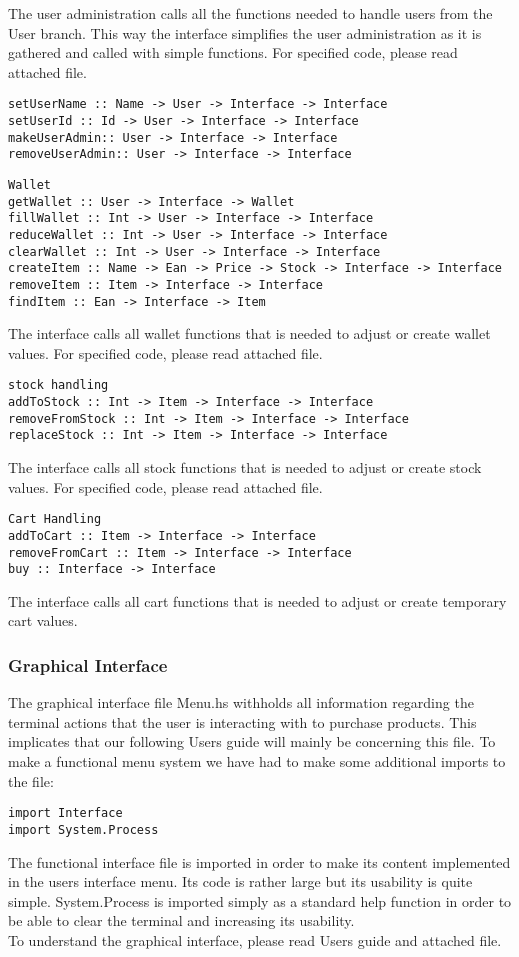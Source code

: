\documentclass[11pt]{article}
\begin{document}
The user administration calls all the functions needed to handle users from the User branch. This way the interface simplifies the user administration as it is gathered and called with simple functions. For specified code, please read attached file.
\begin{lstlisting}
setUserName :: Name -> User -> Interface -> Interface
setUserId :: Id -> User -> Interface -> Interface
makeUserAdmin:: User -> Interface -> Interface
removeUserAdmin:: User -> Interface -> Interface
\end{lstlisting}
\begin{lstlisting}
Wallet
getWallet :: User -> Interface -> Wallet
fillWallet :: Int -> User -> Interface -> Interface
reduceWallet :: Int -> User -> Interface -> Interface
clearWallet :: Int -> User -> Interface -> Interface
createItem :: Name -> Ean -> Price -> Stock -> Interface -> Interface
removeItem :: Item -> Interface -> Interface
findItem :: Ean -> Interface -> Item
\end{lstlisting}
The interface calls all wallet functions that is needed to adjust or create wallet values. For specified code, please read attached file.
\begin{lstlisting}
stock handling
addToStock :: Int -> Item -> Interface -> Interface
removeFromStock :: Int -> Item -> Interface -> Interface
replaceStock :: Int -> Item -> Interface -> Interface
\end{lstlisting}
The interface calls all stock functions that is needed to adjust or create stock values. For specified code, please read attached file.
\begin{lstlisting}
Cart Handling
addToCart :: Item -> Interface -> Interface
removeFromCart :: Item -> Interface -> Interface
buy :: Interface -> Interface
\end{lstlisting}
The interface calls all cart functions that is needed to adjust or create temporary cart values.
\subsubsection{Graphical Interface}
The graphical interface file Menu.hs withholds all information regarding the terminal actions that the user is interacting with to purchase products. This implicates that our following Users guide will mainly be concerning this file. To make a functional menu system we have had to make some additional imports to the file:
\begin{lstlisting}
import Interface
import System.Process
\end{lstlisting}
The functional interface file is imported in order to make its content implemented in the users interface menu. Its code is rather large but its usability is quite simple. System.Process is imported simply as a standard help function in order to be able to clear the terminal and increasing its usability.
\\
To understand the graphical interface, please read Users guide and attached file.
\end{document}
